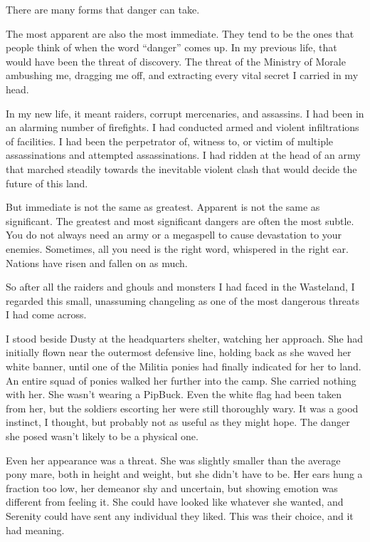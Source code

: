 There are many forms that danger can take.

The most apparent are also the most immediate. They tend to be the ones that people think of when the word “danger” comes up. In my previous life, that would have been the threat of discovery. The threat of the Ministry of Morale ambushing me, dragging me off, and extracting every vital secret I carried in my head.

In my new life, it meant raiders, corrupt mercenaries, and assassins. I had been in an alarming number of firefights. I had conducted armed and violent infiltrations of facilities. I had been the perpetrator of, witness to, or victim of multiple assassinations and attempted assassinations. I had ridden at the head of an army that marched steadily towards the inevitable violent clash that would decide the future of this land.

But immediate is not the same as greatest. Apparent is not the same as significant. The greatest and most significant dangers are often the most subtle. You do not always need an army or a megaspell to cause devastation to your enemies. Sometimes, all you need is the right word, whispered in the right ear. Nations have risen and fallen on as much.

So after all the raiders and ghouls and monsters I had faced in the Wasteland, I regarded this small, unassuming changeling as one of the most dangerous threats I had come across.

I stood beside Dusty at the headquarters shelter, watching her approach. She had initially flown near the outermost defensive line, holding back as she waved her white banner, until one of the Militia ponies had finally indicated for her to land. An entire squad of ponies walked her further into the camp. She carried nothing with her. She wasn’t wearing a PipBuck. Even the white flag had been taken from her, but the soldiers escorting her were still thoroughly wary. It was a good instinct, I thought, but probably not as useful as they might hope. The danger she posed wasn’t likely to be a physical one.

Even her appearance was a threat. She was slightly smaller than the average pony mare, both in height and weight, but she didn’t have to be. Her ears hung a fraction too low, her demeanor shy and uncertain, but showing emotion was different from feeling it. She could have looked like whatever she wanted, and Serenity could have sent any individual they liked. This was their choice, and it had meaning.

